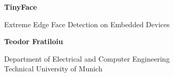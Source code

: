    \begin{center}
        \vspace*{40 pt}
        \begin{flushleft}
            \Huge
            \textbf{TinyFace}
            
            \vspace{10 pt}

            \huge
            Extreme Edge Face Detection on Embedded Devices
        \end{flushleft}
        
        \begin{flushright}
            \vspace{350 pt}
            \huge
            \textbf{Teodor Fratiloiu}
            
            \vspace{30 pt}

            \Large
            Department of Electrical and Computer Engineering \\
            Technical University of Munich
            \vspace{30 pt} 
        \end{flushright}           
         
        
   \end{center}